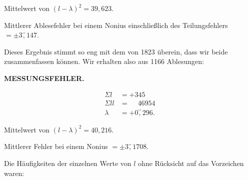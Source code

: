\par\noindent\hspace*{\parindent}Mittelwert von $(l-\lambda)^2=39{,}623$.
\par\noindent\hspace*{\parindent}Mittlerer Ablesefehler bei einem Nonius einschließlich des Teilungsfehlers $=\pm3\overset{\prime\prime}{,}147$.
\par\bigskip\bigskip
\par\noindent\hspace*{\parindent}Dieses Ergebnis stimmt so eng mit dem von 1823 überein, dass wir beide zusammenfassen können. Wir erhalten also aus 1166 Ablesungen:

\par\clearpage
\noindent\null\hfill{\small\textbf{MESSUNGSFEHLER.}}\hfill{}\par\medskip
\[
\begin{aligned}
\Sigma l&=+345\\
\Sigma ll&=\phantom{+}46954\\
\lambda&=+0\overset{\prime\prime}{,}296.
\end{aligned}
\]
\par\noindent\hspace*{\parindent}Mittelwert von $(l-\lambda)^2=40{,}216$.
\par\noindent\hspace*{\parindent}Mittlerer Fehler bei einem Nonius $=\pm3\overset{\prime\prime}{,}1708$.
\par\noindent\hspace*{\parindent}Die Häufigkeiten der einzelnen Werte von $l$ ohne Rücksicht auf das Vorzeichen waren:
